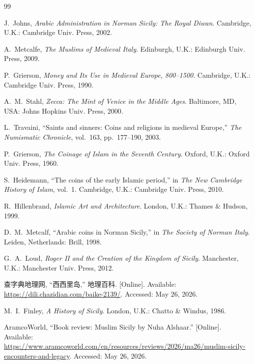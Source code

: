 \documentclass[UTF8,a4paper,12pt]{ctexart}
\begin{document}
\clearpage
\renewcommand{\refname}{参考文献}
\begin{thebibliography}{99}
\setlength{\itemsep}{0pt}

J.~Johns, \emph{Arabic Administration in Norman Sicily: The Royal Diwan}. Cambridge, U.K.: Cambridge Univ. Press, 2002.

A.~Metcalfe, \emph{The Muslims of Medieval Italy}. Edinburgh, U.K.: Edinburgh Univ. Press, 2009.

P.~Grierson, \emph{Money and Its Use in Medieval Europe, 800--1500}. Cambridge, U.K.: Cambridge Univ. Press, 1990.

A.~M.~Stahl, \emph{Zecca: The Mint of Venice in the Middle Ages}. Baltimore, MD, USA: Johns Hopkins Univ. Press, 2000.

L.~Travaini, ``Saints and sinners: Coins and religions in medieval Europe,'' \emph{The Numismatic Chronicle}, vol.~163, pp.~177--190, 2003.

P.~Grierson, \emph{The Coinage of Islam in the Seventh Century}. Oxford, U.K.: Oxford Univ. Press, 1960.

S.~Heidemann, ``The coins of the early Islamic period,'' in \emph{The New Cambridge History of Islam}, vol.~1. Cambridge, U.K.: Cambridge Univ. Press, 2010.

R.~Hillenbrand, \emph{Islamic Art and Architecture}. London, U.K.: Thames \& Hudson, 1999.

D.~M.~Metcalf, ``Arabic coins in Norman Sicily,'' in \emph{The Society of Norman Italy}. Leiden, Netherlands: Brill, 1998.

G.~A.~Loud, \emph{Roger II and the Creation of the Kingdom of Sicily}. Manchester, U.K.: Manchester Univ. Press, 2012.

查字典地理网, ``西西里岛,'' 地理百科. [Online]. Available: \url{https://dili.chazidian.com/baike-2139/}. Accessed: May 26, 2026.

M.~I.~Finley, \emph{A History of Sicily}. London, U.K.: Chatto \& Windus, 1986.

AramcoWorld, ``Book review: Muslim Sicily by Nuha Alshaar.'' [Online]. Available: \url{https://www.aramcoworld.com/en/resources/reviews/2026/ma26/muslim-sicily-encounters-and-legacy}. Accessed: May 26, 2026.


\end{thebibliography}
\end{document}

